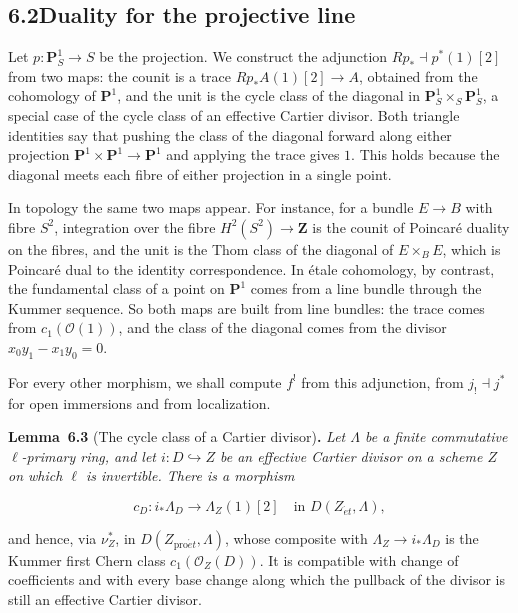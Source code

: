 \documentclass[11pt]{article}
\newenvironment{bpstatement}[2]{\par\addvspace{0.6\baselineskip}\noindent\textbf{#1}#2\textbf{.}\enspace\ignorespaces}
  {\par\addvspace{0.4\baselineskip}}
\newenvironment{bpstatementit}[2]{\begin{bpstatement}{#1}{#2}\itshape\ignorespaces}{\end{bpstatement}}
\begin{document}
\subsection*{\texorpdfstring{6.2\quad Duality for the projective line}{6.2 Duality for the projective line}}
\label{bp9}%
\label{bp10}%
Let \(p:\mathbf P^1_S\to S\) be the projection. We construct the adjunction \(Rp_*\dashv p^*(1)[2]\) from two maps: the counit is a trace \(Rp_*A(1)[2]\to A\), obtained from the cohomology of \(\mathbf P^1\), and the unit is the cycle class of the diagonal in \(\mathbf P^1_S\times_S\mathbf P^1_S\), a special case of the cycle class of an effective Cartier divisor. Both triangle identities say that pushing the class of the diagonal forward along either projection \(\mathbf P^1\times\mathbf P^1\to\mathbf P^1\) and applying the trace gives \(1\). This holds because the diagonal meets each fibre of either projection in a single point.

In topology the same two maps appear. For instance, for a bundle \(E\to B\) with fibre \(S^2\), integration over the fibre \(H^2(S^2)\to\mathbf Z\) is the counit of Poincaré duality on the fibres, and the unit is the Thom class of the diagonal of \(E\times_BE\), which is Poincaré dual to the identity correspondence. In étale cohomology, by contrast, the fundamental class of a point on \(\mathbf P^1\) comes from a line bundle through the Kummer sequence. So both maps are built from line bundles: the trace comes from \(c_1(\mathcal O(1))\), and the class of the diagonal comes from the divisor \(x_0y_1-x_1y_0=0\).

For every other morphism, we shall compute \(f^!\) from this adjunction, from \(j_!\dashv j^*\) for open immersions and from localization.

\label{bp11}%
\begin{bpstatementit}{Lemma~6.3}{ (The cycle class of a Cartier divisor)}
Let \(\Lambda\) be a finite commutative \(\ell\)-primary ring, and let \(i:D\hookrightarrow Z\) be an effective Cartier divisor on a scheme \(Z\) on which \(\ell\) is invertible. There is a morphism

\[
c_D:i_*\Lambda_D\longrightarrow\Lambda_Z(1)[2]\quad\text{in }D(Z_{\acute{e}t},\Lambda),
\]

and hence, via \(\nu_Z^*\), in \(D(Z_{\mathrm{pro}\acute{e}t},\Lambda)\), whose composite with \(\Lambda_Z\to i_*\Lambda_D\) is the Kummer first Chern class \(c_1(\mathcal O_Z(D))\). It is compatible with change of coefficients and with every base change along which the pullback of the divisor is still an effective Cartier divisor.
\end{bpstatementit}
\end{document}
